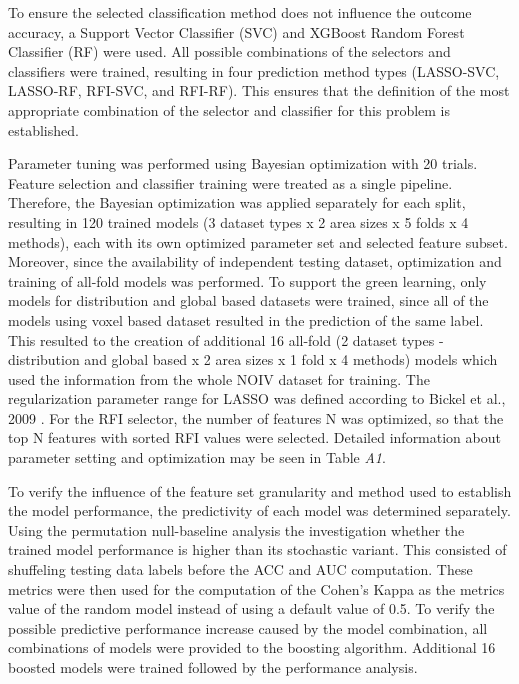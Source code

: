 \documentclass[preprint,12pt]{elsarticle}
\begin{document}
To ensure the selected classification method does not influence the outcome accuracy, a Support Vector Classifier (SVC) and XGBoost Random Forest Classifier (RF) were used.  All possible combinations of the selectors and classifiers were trained, resulting in four prediction method types (LASSO-SVC, LASSO-RF, RFI-SVC, and RFI-RF). This ensures that the definition of the most appropriate combination of the selector and classifier for this problem is established.

Parameter tuning was performed using Bayesian optimization with 20 trials. Feature selection and classifier training were treated as a single pipeline. Therefore, the Bayesian optimization was applied separately for each split, resulting in 120 trained models (3 dataset types x 2 area sizes x 5 folds x 4 methods), each with its own optimized parameter set and selected feature subset. Moreover, since the availability of independent testing dataset, optimization and training of all-fold models was performed. To support the green learning, only models for distribution and global based datasets were trained, since all of the models using voxel based dataset resulted in the prediction of the same label. This resulted to the creation of additional 16 all-fold (2 dataset types - distribution and global based x 2 area sizes x 1 fold x 4 methods) models which used the information from the whole NOIV dataset for training. The regularization parameter range for LASSO was defined according to Bickel et al., 2009 \cite{Bickel200981}. For the RFI selector, the number of features N was optimized, so that the top N features with sorted RFI values were selected. Detailed information about parameter setting and optimization may be seen in Table \textit{A1}.

To verify the influence of the feature set granularity and method used to establish the model performance, the predictivity of each model was determined separately. Using the permutation null-baseline analysis the investigation whether the trained model performance is higher than its stochastic variant. This consisted of shuffeling testing data labels before the ACC and AUC computation. These metrics were then used for the computation of the Cohen's Kappa as the metrics value of the random model instead of using a default value of 0.5.
To verify the possible predictive performance increase caused by the model combination, all combinations of models were provided to the boosting algorithm. Additional 16 boosted models were trained followed by the performance analysis.
\end{document}
